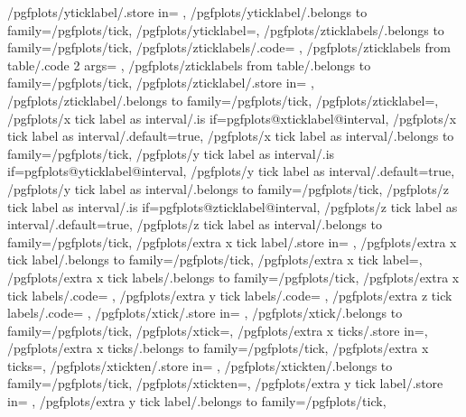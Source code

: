 {	/pgfplots/yticklabel/.store in=	\pgfplots@yticklabel,
	/pgfplots/yticklabel/.belongs to family=/pgfplots/tick,
	/pgfplots/yticklabel=,
	/pgfplots/zticklabels/.belongs to family=/pgfplots/tick,
	/pgfplots/zticklabels/.code={%
		\pgfplotslistnew{}%
		\let\pgfplots@zticklabel=\pgfplots@user@ticklabel@list@z
	},
	/pgfplots/zticklabels from table/.code 2 args={%
		\to\pgfplots@zticklabels
		\let\pgfplots@zticklabel=\pgfplots@user@ticklabel@list@z
	},
	/pgfplots/zticklabels from table/.belongs to family=/pgfplots/tick,
	/pgfplots/zticklabel/.store in=	\pgfplots@zticklabel,
	/pgfplots/zticklabel/.belongs to family=/pgfplots/tick,
	/pgfplots/zticklabel=,
	/pgfplots/x tick label as interval/.is if=pgfplots@xticklabel@interval,
	/pgfplots/x tick label as interval/.default=true,
	/pgfplots/x tick label as interval/.belongs to family=/pgfplots/tick,
	/pgfplots/y tick label as interval/.is if=pgfplots@yticklabel@interval,
	/pgfplots/y tick label as interval/.default=true,
	/pgfplots/y tick label as interval/.belongs to family=/pgfplots/tick,
	/pgfplots/z tick label as interval/.is if=pgfplots@zticklabel@interval,
	/pgfplots/z tick label as interval/.default=true,
	/pgfplots/z tick label as interval/.belongs to family=/pgfplots/tick,
	/pgfplots/extra x tick label/.store in=	\pgfplots@extra@xticklabel,
	/pgfplots/extra x tick label/.belongs to family=/pgfplots/tick,
	/pgfplots/extra x tick label=,
	/pgfplots/extra x tick labels/.belongs to family=/pgfplots/tick,
	/pgfplots/extra x tick labels/.code={%
		\pgfplotslistnew{}%
		\let\pgfplots@extra@xticklabel=\pgfplots@user@extra@ticklabel@list@x
	},
	/pgfplots/extra y tick labels/.code={%
		\pgfplotslistnew{}%
		\let\pgfplots@extra@yticklabel=\pgfplots@user@extra@ticklabel@list@y
	},
	/pgfplots/extra z tick labels/.code={%
		\pgfplotslistnew{}%
		\let\pgfplots@extra@zticklabel=\pgfplots@user@extra@ticklabel@list@z
	},
	/pgfplots/xtick/.store in=			\pgfplots@xtick,
	/pgfplots/xtick/.belongs to family=/pgfplots/tick,
	/pgfplots/xtick=,
	/pgfplots/extra x ticks/.store in=\pgfplots@extra@xtick,
	/pgfplots/extra x ticks/.belongs to family=/pgfplots/tick,
	/pgfplots/extra x ticks=,
	/pgfplots/xtickten/.store in=		\pgfplots@xtickten,
	/pgfplots/xtickten/.belongs to family=/pgfplots/tick,
	/pgfplots/xtickten=,
	/pgfplots/extra y tick label/.store in=	\pgfplots@extra@yticklabel,
	/pgfplots/extra y tick label/.belongs to family=/pgfplots/tick,
}
